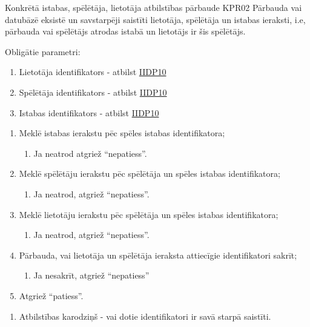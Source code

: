 \procedureTable
{Konkrētā istabas, spēlētāja, lietotāja atbilstības pārbaude}
{KPR02}
{
	Pārbauda vai datubāzē eksistē un savstarpēji saistīti lietotāja, spēlētāja un istabas ieraksti, i.e, pārbauda vai spēlētājs atrodas istabā un lietotājs ir šis spēlētājs.
}
{
	Obligātie parametri:
	\begin{enumerate}
		\item Lietotāja identifikators - atbilst \hyperref[tab:IIDP10]{IIDP10}
		\item Spēlētāja identifikators - atbilst \hyperref[tab:IIDP10]{IIDP10}
		\item Istabas identifikators - atbilst \hyperref[tab:IIDP10]{IIDP10}
	\end{enumerate}
}
{
	\begin{enumerate}
		\item Meklē istabas ierakstu pēc spēles istabas identifikatora;
		      \begin{enumerate}
			      \item Ja neatrod atgriež ``nepatiess''.
		      \end{enumerate}
		\item Meklē spēlētāju ierakstu pēc spēlētāja un spēles istabas identifikatora;
		      \begin{enumerate}
			      \item Ja neatrod, atgriež ``nepatiess''.
		      \end{enumerate}
		\item Meklē lietotāju ierakstu pēc spēlētāja un spēles istabas identifikatora;
		      \begin{enumerate}
			      \item Ja neatrod, atgriež ``nepatiess''.
		      \end{enumerate}
		\item Pārbauda, vai lietotāja un spēlētāja ieraksta attiecīgie identifikatori sakrīt;
		      \begin{enumerate}
			      \item Ja nesakrīt, atgriež ``nepatiess''
		      \end{enumerate}
		\item Atgriež ``patiess''.
	\end{enumerate}
}
{
	\begin{enumerate}
		\item Atbilstības karodziņš - vai dotie identifikatori ir savā starpā saistīti.
	\end{enumerate}
}
